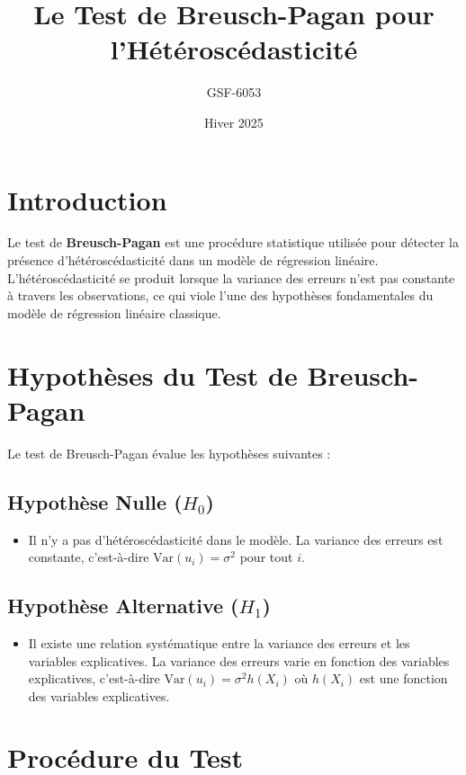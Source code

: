 \documentclass[14pt]{extarticle} %
\title{Le Test de Breusch-Pagan pour l'Hétéroscédasticité}
\author{GSF-6053}
\date{Hiver 2025}
\theoremstyle{definition}
\theoremstyle{plain}
\begin{document}
\maketitle
\tableofcontents
\newpage

\section{Introduction}

Le test de \textbf{Breusch-Pagan} est une procédure statistique utilisée pour détecter la présence d'hétéroscédasticité dans un modèle de régression linéaire. L'hétéroscédasticité se produit lorsque la variance des erreurs n'est pas constante à travers les observations, ce qui viole l'une des hypothèses fondamentales du modèle de régression linéaire classique.

\section{Hypothèses du Test de Breusch-Pagan}

Le test de Breusch-Pagan évalue les hypothèses suivantes :

\subsection{Hypothèse Nulle ($H_0$)}
\begin{itemize}
    \item Il n'y a pas d'hétéroscédasticité dans le modèle. La variance des erreurs est constante, c'est-à-dire $\text{Var}(u_i) = \sigma^2$ pour tout $i$.
\end{itemize}

\subsection{Hypothèse Alternative ($H_1$)}
\begin{itemize}
    \item Il existe une relation systématique entre la variance des erreurs et les variables explicatives. La variance des erreurs varie en fonction des variables explicatives, c'est-à-dire $\text{Var}(u_i) = \sigma^2 h(X_i)$ où $h(X_i)$ est une fonction des variables explicatives.
\end{itemize}

\section{Procédure du Test}
\end{document}
